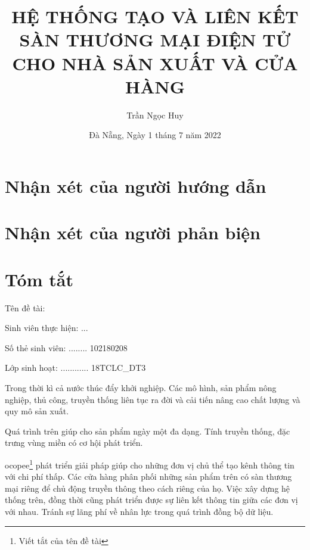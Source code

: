 \documentclass[11pt]{report}
\title{HỆ THỐNG TẠO VÀ LIÊN KẾT SÀN THƯƠNG MẠI ĐIỆN TỬ CHO NHÀ SẢN XUẤT VÀ CỬA HÀNG}
\author{Trần Ngọc Huy}
\date{Đà Nẵng, Ngày 1 tháng 7 năm 2022}
\newcommand{\msv}{102180208}
\newcommand{\myclass}{18TCLC\_DT3}
\begin{document}
\chapter*{Nhận xét của người hướng dẫn}
\pagebreak

\chapter*{Nhận xét của người phản biện}
\pagebreak



\chapter*{Tóm tắt}
\raggedright
\makeatletter




Tên đề tài: \@title

Sinh viên thực hiện: ...\@author \dotfill

Số thẻ sinh viên: ........ \msv \dotfill

Lớp sinh hoạt: ............ \myclass \dotfill


\vspace{0.5cm}
\justifying

Trong thời kì cả nước thúc đẩy khởi nghiệp. Các mô hình, sản phẩm nông nghiệp, thủ công, truyền thống liên tục ra đời và cải tiến nâng cao chất lượng và quy mô sản xuất.

Quá trình trên giúp cho sản phẩm ngày một đa dạng. Tính truyền thống, đặc trưng vùng miền có cơ hội phát triển.

\gls{ocopee}\footnote{Viết tắt của tên đề tài} phát triển giải pháp giúp cho những đơn vị chủ thể tạo kênh thông tin với chi phí thấp. Các cửa hàng phân phối những sản phẩm trên có sàn thương mại riêng để chủ động truyền thông theo cách riêng của họ. Việc xây dựng hệ thống trên, đồng thời cũng phát triển được sự liên kết thông tin giữa các đơn vị với nhau. Tránh sự lãng phí về nhân lực trong quá trình đồng bộ dữ liệu.
\end{document}

